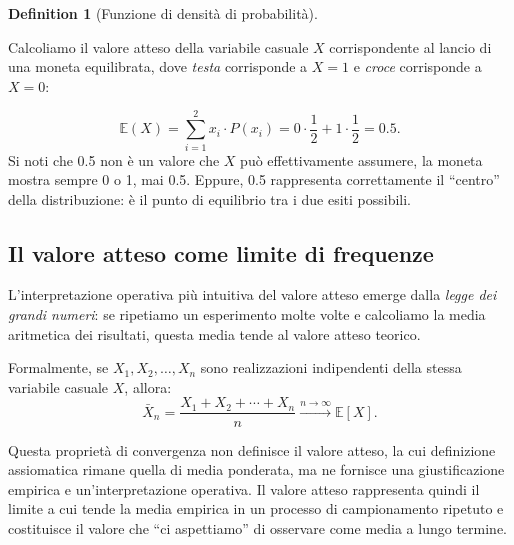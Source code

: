 \documentclass[
  letterpaper,
  DIV=11,
  numbers=noendperiod,
  oneside]{scrreprt}
\theoremstyle{definition}
\theoremstyle{plain}
\theoremstyle{definition}
\newtheorem{definition}{Definition}[chapter]
\theoremstyle{remark}
\begin{document}
\begin{definition}[Funzione di densità di
probabilità]
\begin{tcolorbox}[enhanced jigsaw, arc=.35mm, breakable, colbacktitle=quarto-callout-note-color!10!white, opacityback=0, toprule=.15mm, rightrule=.15mm, colback=white, opacitybacktitle=0.6, leftrule=.75mm, coltitle=black, bottomtitle=1mm, left=2mm, toptitle=1mm, title=\textcolor{quarto-callout-note-color}{\faInfo}\hspace{0.5em}{Esercizio}, titlerule=0mm, bottomrule=.15mm, colframe=quarto-callout-note-color-frame]

Calcoliamo il valore atteso della variabile casuale \(X\) corrispondente
al lancio di una moneta equilibrata, dove \emph{testa} corrisponde a
\(X = 1\) e \emph{croce} corrisponde a \(X = 0\):

\[
\mathbb{E}(X) = \sum_{i=1}^{2} x_i \cdot P(x_i) = 0 \cdot \frac{1}{2} + 1 \cdot \frac{1}{2} = 0.5.
\] Si noti che 0.5 non è un valore che \(X\) può effettivamente
assumere, la moneta mostra sempre 0 o 1, mai 0.5. Eppure, 0.5
rappresenta correttamente il ``centro'' della distribuzione: è il punto
di equilibrio tra i due esiti possibili.

\end{tcolorbox}

\subsection{Il valore atteso come limite di
frequenze}\label{il-valore-atteso-come-limite-di-frequenze}

L'interpretazione operativa più intuitiva del valore atteso emerge dalla
\emph{legge dei grandi numeri}: se ripetiamo un esperimento molte volte
e calcoliamo la media aritmetica dei risultati, questa media tende al
valore atteso teorico.

Formalmente, se \(X_1, X_2, \ldots, X_n\) sono realizzazioni
indipendenti della stessa variabile casuale \(X\), allora: \[
\bar{X}_n = \frac{X_1 + X_2 + \cdots + X_n}{n} \xrightarrow{n \to \infty} \mathbb{E}[X].
\]

Questa proprietà di convergenza non definisce il valore atteso, la cui
definizione assiomatica rimane quella di media ponderata, ma ne fornisce
una giustificazione empirica e un'interpretazione operativa. Il valore
atteso rappresenta quindi il limite a cui tende la media empirica in un
processo di campionamento ripetuto e costituisce il valore che ``ci
aspettiamo'' di osservare come media a lungo termine.

\begin{tcolorbox}[enhanced jigsaw, arc=.35mm, breakable, colbacktitle=quarto-callout-note-color!10!white, opacityback=0, toprule=.15mm, rightrule=.15mm, colback=white, opacitybacktitle=0.6, leftrule=.75mm, coltitle=black, bottomtitle=1mm, left=2mm, toptitle=1mm, title=\textcolor{quarto-callout-note-color}{\faInfo}\hspace{0.5em}{Esercizio: valore atteso del lancio di due dadi}, titlerule=0mm, bottomrule=.15mm, colframe=quarto-callout-note-color-frame]


\end{tcolorbox}
\end{definition}
\end{document}
